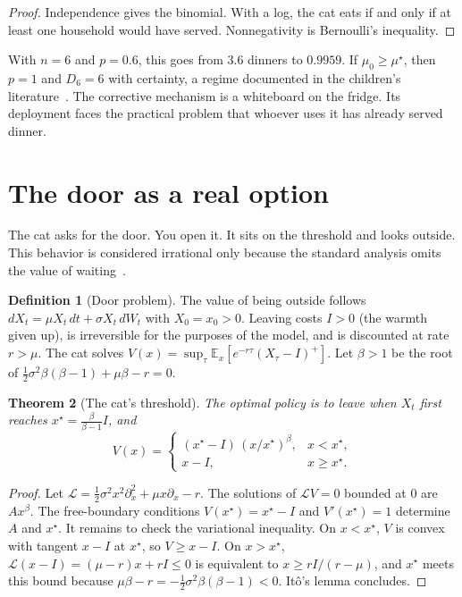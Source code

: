 \documentclass[11pt,a4paper]{article}
\theoremstyle{plain}
\newtheorem{teorema}{Theorem}[section]
\theoremstyle{definition}
\newtheorem{definicion}[teorema]{Definition}
\theoremstyle{remark}
\numberwithin{equation}{section}
\newcommand{\E}{\mathbb{E}}
\begin{document}
\begin{proof}
Independence gives the binomial. With a log, the cat eats if and only if at least one household would have served. Nonnegativity is Bernoulli's inequality.
\end{proof}

With $n=6$ and $p=0.6$, this goes from $3.6$ dinners to $0.9959$. If $\mu_0\ge\mu^\star$, then $p=1$ and $D_6=6$ with certainty, a regime documented in the children's literature~\cite{moore}. The corrective mechanism is a whiteboard on the fridge. Its deployment faces the practical problem that whoever uses it has already served dinner.

\section{The door as a real option}\label{sec:puerta}

The cat asks for the door. You open it. It sits on the threshold and looks outside. This behavior is considered irrational only because the standard analysis omits the value of waiting~\cite{mcdonaldsiegel,dixitpindyck}.

\begin{definicion}[Door problem]
The value of being outside follows $dX_t=\mu X_t\,dt+\sigma X_t\,dW_t$ with $X_0=x_0>0$. Leaving costs $I>0$ (the warmth given up), is irreversible for the purposes of the model, and is discounted at rate $r>\mu$. The cat solves $V(x)=\sup_\tau\E_x[e^{-r\tau}(X_\tau-I)^+]$. Let $\beta>1$ be the root of $\tfrac12\sigma^2\beta(\beta-1)+\mu\beta-r=0$.
\end{definicion}

\begin{teorema}[The cat's threshold]\label{teo:umbral}
The optimal policy is to leave when $X_t$ first reaches $x^\star=\frac{\beta}{\beta-1}I$, and
\begin{equation}
  V(x)=\begin{cases}(x^\star-I)\,(x/x^\star)^{\beta}, & x<x^\star,\\ x-I, & x\ge x^\star.\end{cases}
\end{equation}
\end{teorema}

\begin{proof}
Let $\mathcal L=\tfrac12\sigma^2x^2\partial_x^2+\mu x\partial_x-r$. The solutions of $\mathcal LV=0$ bounded at $0$ are $Ax^\beta$. The free-boundary conditions $V(x^\star)=x^\star-I$ and $V'(x^\star)=1$ determine $A$ and $x^\star$. It remains to check the variational inequality. On $x<x^\star$, $V$ is convex with tangent $x-I$ at $x^\star$, so $V\ge x-I$. On $x>x^\star$, $\mathcal L(x-I)=(\mu-r)x+rI\le 0$ is equivalent to $x\ge rI/(r-\mu)$, and $x^\star$ meets this bound because $\mu\beta-r=-\tfrac12\sigma^2\beta(\beta-1)<0$. Itô's lemma concludes.
\end{proof}
\end{document}
